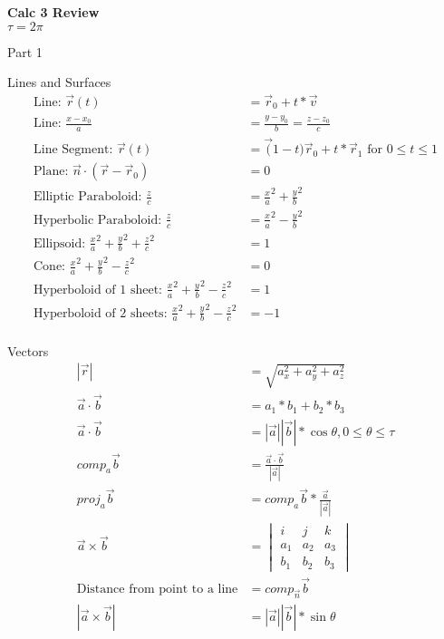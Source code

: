 \documentclass[12pt]{article}
\renewcommand{\=}[1]{\stackrel{#1}{=}} %
\theoremstyle{definition}
\theoremstyle{remark}
\begin{document}
\begin{center}
  {\LARGE
    \textbf{Calc 3 Review}\\
    \normalsize
    \textnormal {$\tau = 2\pi$}
    \\[1ex]}

  
\end{center}

Part 1

Lines and Surfaces
\begin{align*}
  \textrm{Line: } \vec r(t) &= \vec r_0 + t*\vec v\\
  \textrm{Line: } \frac{x-x_0}{a} &= \frac{y-y_0}{b} = \frac{z-z_0}{c}\\
  \textrm{Line Segment: } \vec r(t) &= \vec (1-t)\vec r_0 + t*\vec
  r_1 \textrm{ for } 0 \leq t \leq 1 \\
  \textrm{Plane: } \vec n \cdot (\vec r - \vec r_0) &= 0 \\
  \textrm{Elliptic Paraboloid: } \frac{z}{c} &= \frac{x}{a}^2+\frac{y}{b}^2\\
  \textrm{Hyperbolic Paraboloid: } \frac{z}{c} &= \frac{x}{a}^2-\frac{y}{b}^2\\
  \textrm{Ellipsoid: }\frac{x}{a}^2+\frac{y}{b}^2+\frac{z}{c}^2&= 1\\
  \textrm{Cone: } \frac{x}{a}^2+\frac{y}{b}^2-\frac{z}{c}^2&= 0\\
  \textrm{Hyperboloid of 1 sheet: } \frac{x}{a}^2+\frac{y}{b}^2-\frac{z}{c}^2&= 1\\
  \textrm{Hyperboloid of 2 sheets: } \frac{x}{a}^2+\frac{y}{b}^2-\frac{z}{c}^2&= -1\\
\end{align*}

Vectors
\begin{align*}
|\vec r| &= \sqrt{a_x^2+a_y^2+a_z^2}\\
\vec{a} \cdot \vec{b} &= a_1*b_1 + b_2*b_3\\
\vec{a} \cdot \vec{b} &= |\vec a||\vec b|*\cos{\theta}, 0 \leq \theta \leq \tau \\
comp_a\vec b &=  \frac{\vec a \cdot \vec b}{|\vec a|} \\
proj_a \vec b &= comp_a \vec b * \frac{\vec a}{|\vec a|}\\
\vec a \times \vec b &= 
\begin{vmatrix}
  i   & j   & k \\
  a_1 & a_2 & a_3 \\
  b_1 & b_2 & b_3
\end{vmatrix}
\\
\textrm{Distance from point to a line} &= comp_{\vec n}\vec b \\
|\vec a \times \vec b | &= |\vec a| |\vec b| * \sin{\theta}\\
\end{align*}
\end{document}
